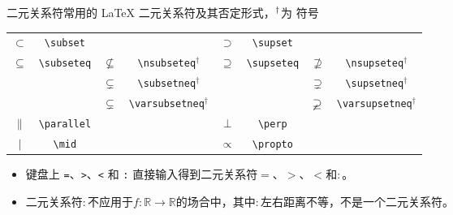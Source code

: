 \documentclass[mathserif]{beamer}
\newcommand{\real}{\mathbb R}
\begin{document}
\begin{frame}[fragile]{二元关系符}{常用的 \LaTeX{} 二元关系符及其否定形式，$\prescript{\dagger}{}{}$为 \AmS{} 符号}
\begin{table}[H]
\centering
\begin{tabular}{cc|cc|cc|cc}
	\toprule
	$\subset$ & \lstinline'\subset' & ~ & ~ & $\supset$ & \lstinline'\supset' & ~ & ~ \\
	$\subseteq$ & \lstinline'\subseteq' & $\nsubseteq$ & \lstinline'\nsubseteq'$^{\dagger}$ & $\supseteq$ & \lstinline'\supseteq' & $\nsupseteq$ & \lstinline'\nsupseteq'$^{\dagger}$ \\
	~ & ~ & $\subsetneq$ & \lstinline'\subsetneq'$^{\dagger}$ & ~ & ~ & $\supsetneq$ & \lstinline'\supsetneq'$^{\dagger}$ \\
	~ & ~ & $\varsubsetneq$ & \lstinline'\varsubsetneq'$^{\dagger}$ & ~ & ~ & $\varsupsetneq$ & \lstinline'\varsupsetneq'$^{\dagger}$ \\
	$\parallel$ & \lstinline'\parallel' & ~ & ~ & $\perp$ & \lstinline'\perp' & ~ & ~ \\
	$\mid$ & \lstinline'\mid' & ~ & ~ & $\propto$ & \lstinline'\propto' & ~ & ~ \\
	\bottomrule
\end{tabular}
\end{table}
\begin{itemize}

\item 键盘上 \lstinline'='、\lstinline'>'、\lstinline'<' 和 \lstinline':' 直接输入得到二元关系符$=$、$>$、$<$和$:$。

\item 二元关系符$:$不应用于$f \colon \real \to \real$的场合中，其中$:$左右距离不等，不是一个二元关系符。

\end{itemize}
\end{frame}
\end{document}
